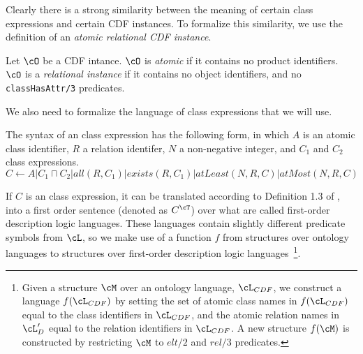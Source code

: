 Clearly there is a strong similarity between the meaning of certain
class expressions and certain CDF instances.  To formalize this
similarity, we use the definition of an {\em atomic relational CDF
instance}.
\begin{definition}
Let $\cO$ be a CDF intance.  $\cO$ is {\em atomic} if it contains no
product identifiers.  $\cO$ is a {\em relational instance} if it
contains no object identifiers, and no {\tt classHasAttr/3}
predicates.
\end{definition}


We also need to formalize the language of class expressions that we
will use.

\begin{definition}
The syntax of an \omsdl{} class expression has the following form, in
which $A$ is an atomic class identifier, $R$ a relation identifer, $N$
a non-negative integer, and $C_1$ and $C_2$ \omsdl{} class expressions.
\[ C \leftarrow A | C_1 \sqcap C_2 | all(R,C_1) | exists(R,C_1) 
	| atLeast(N,R,C) | atMost(N,R,C) \]
\end{definition}

If $C$ is an \omsdl{} class expression, it can be translated according
to Definition 1.3 of \cite{Swif04}, into a first order sentence
(denoted as $C^{\cT}$) over what are called first-order description
logic languages.  These languages contain slightly different predicate
symbols from $\cL$, so we make use of a function $f$ from structures
over ontology languages to structures over first-order description
logic languages~\footnote{Given a structure $\cM$ over an ontology
language, $\cL_{CDF}$, we construct a language $f(\cL_{CDF})$ by
setting the set of atomic class names in $f(\cL_{CDF})$ equal to the
class identifiers in $\cL_{CDF}$, and the atomic relation names in
$\cL'_D$ equal to the relation identifiers in $\cL_{CDF}$.  A new
structure $f(\cM)$ is constructed by restricting $\cM$ to $elt/2$
and $rel/3$ predicates.}.


